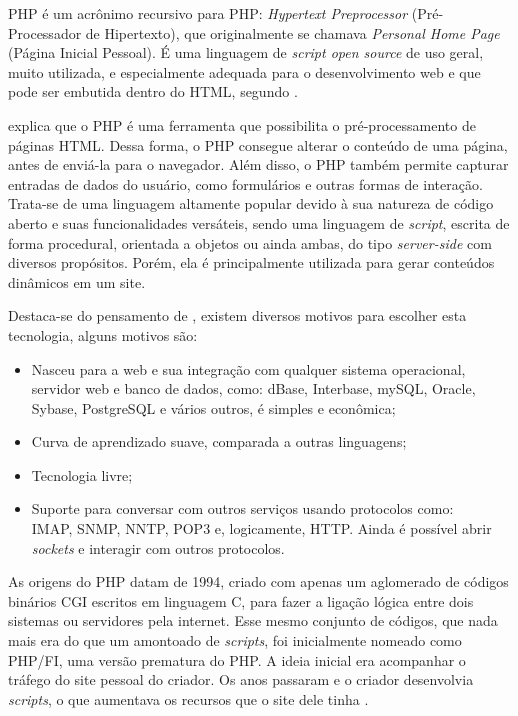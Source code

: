 PHP é um acrônimo recursivo para PHP: \textit{Hypertext Preprocessor} (Pré-Processador de Hipertexto), que originalmente se chamava \textit{Personal Home Page} (Página Inicial Pessoal). É uma linguagem de \textit{script open source} de uso geral, muito utilizada, e especialmente adequada para o desenvolvimento web e que pode ser embutida dentro do HTML, segundo . %

 explica que o PHP é uma ferramenta que possibilita o pré-processamento de páginas HTML. Dessa forma, o PHP consegue alterar o conteúdo de uma página, antes de enviá-la para o navegador. Além disso, o PHP também permite capturar entradas de dados do usuário, como formulários e outras formas de interação. Trata-se de uma linguagem altamente popular devido à sua natureza de código aberto e suas funcionalidades versáteis, sendo uma linguagem de \textit{script}, escrita de forma procedural, orientada a objetos ou ainda ambas, do tipo \textit{server-side} com diversos propósitos. Porém, ela é principalmente utilizada para gerar conteúdos dinâmicos em um site.

Destaca-se do pensamento de , existem diversos motivos para escolher esta tecnologia, alguns motivos são:

\begin{itemize}
    \item Nasceu para a web e sua integração com qualquer sistema operacional, servidor web e banco de dados, como: dBase, Interbase, mySQL, Oracle, Sybase, PostgreSQL e vários outros, é simples e econômica;
    \item Curva de aprendizado suave, comparada a outras linguagens;
    \item Tecnologia livre;
    \item Suporte para conversar com outros serviços usando protocolos como: \\ IMAP, SNMP, NNTP, POP3 e, logicamente, HTTP. Ainda é possível abrir \textit{sockets} e interagir com outros protocolos.
\end{itemize}

As origens do PHP datam de 1994, criado com apenas um aglomerado de códigos binários CGI escritos em linguagem C, para fazer a ligação lógica entre dois sistemas ou servidores pela internet. Esse mesmo conjunto de códigos, que nada mais era do que um amontoado de \textit{scripts}, foi inicialmente nomeado como PHP/FI, uma versão prematura do PHP. A ideia inicial era acompanhar o tráfego do site pessoal do criador. Os anos passaram e o criador desenvolvia \textit{scripts}, o que aumentava os recursos que o site dele tinha \cite{phpdevelopment}.

